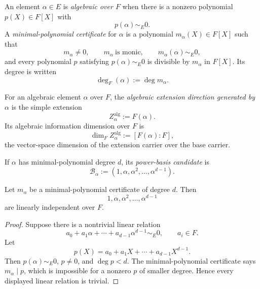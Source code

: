 \begin{definition}
\label{def:unified-reality-algebraic-minimal-polynomial-certificate}
An element $\alpha\in E$ is \emph{algebraic over $F$} when there is a
nonzero polynomial $p(X)\in F[X]$ with
$$
p(\alpha)\sim_E0.
$$
A \emph{minimal-polynomial certificate} for $\alpha$ is a polynomial
$m_\alpha(X)\in F[X]$ such that
$$
m_\alpha\neq0,\qquad
m_\alpha\ \text{is monic},\qquad
m_\alpha(\alpha)\sim_E0,
$$
and every polynomial $p$ satisfying $p(\alpha)\sim_E0$ is divisible by
$m_\alpha$ in $F[X]$. Its degree is written
$$
\deg_F(\alpha):=\deg m_\alpha.
$$
\end{definition}

\begin{definition}
\label{def:unified-reality-algebraic-extension-direction}
For an algebraic element $\alpha$ over $F$, the \emph{algebraic
extension direction generated by $\alpha$} is the simple extension
$$
Z_\alpha^{\mathrm{alg}}:=F(\alpha).
$$
Its algebraic information dimension over $F$ is
$$
\dim_F Z_\alpha^{\mathrm{alg}}
:=
[F(\alpha):F],
$$
the vector-space dimension of the extension carrier over the base
carrier.
\end{definition}

\begin{definition}
\label{def:unified-reality-power-basis-candidate}
If $\alpha$ has minimal-polynomial degree $d$, its \emph{power-basis
candidate} is
$$
\mathcal B_\alpha
:=
(1,\alpha,\alpha^2,\ldots,\alpha^{d-1}).
$$
\end{definition}

\begin{theorem}
\label{thm:unified-reality-power-basis-independence}
Let $m_\alpha$ be a minimal-polynomial certificate of degree $d$. Then
$$
1,\alpha,\alpha^2,\ldots,\alpha^{d-1}
$$
are linearly independent over $F$.
\end{theorem}

\begin{proof}
Suppose there is a nontrivial linear relation
$$
a_0+a_1\alpha+\cdots+a_{d-1}\alpha^{d-1}\sim_E0,
\qquad
a_i\in F.
$$
Let
$$
p(X)=a_0+a_1X+\cdots+a_{d-1}X^{d-1}.
$$
Then $p(\alpha)\sim_E0$, $p\neq0$, and $\deg p<d$. The
minimal-polynomial certificate says $m_\alpha\mid p$, which is
impossible for a nonzero $p$ of smaller degree. Hence every displayed
linear relation is trivial.
\end{proof}

